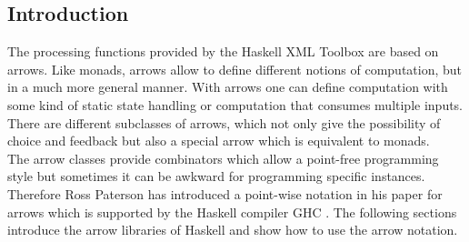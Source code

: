 \documentclass[11pt,a4paper,headsepline, bibtotoc]{scrreprt}
\begin{document}
\subsection{Introduction}
The processing functions provided by the Haskell XML Toolbox are based on arrows. Like monads, arrows allow to define different notions of computation, but in a much more general manner. With arrows one can define computation with some kind of static state handling or computation that consumes multiple inputs. There are different subclasses of arrows, which not only give the possibility of choice and feedback but also a special arrow which is equivalent to monads.\\
The arrow classes provide combinators which allow a point-free programming style but sometimes it can be awkward for programming specific instances. Therefore Ross Paterson has introduced a point-wise notation in his paper \cite{Pat:2001} for arrows which is supported by the Haskell compiler GHC \cite{GHC}. The following sections introduce the arrow libraries of Haskell and show how to use the arrow notation.
\end{document}
